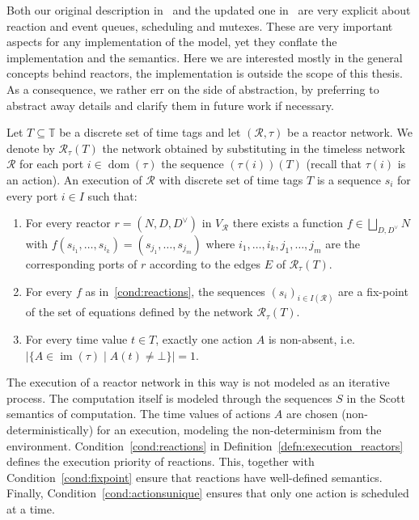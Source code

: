 Both our original description in~\cite{lohstroh_cyphy19} and the updated one in~\cite{lohstroh_phdthesis} are very explicit about reaction and event queues, scheduling and mutexes.
These are very important aspects for any implementation of the model, yet they conflate the implementation and the semantics.
Here we are interested mostly in the general concepts behind reactors, the implementation is outside the scope of this thesis.
As a consequence, we rather err on the side of abstraction, by preferring to abstract away details and clarify them in future work if necessary. 

\begin{defn}
    \label{defn:execution_reactors}
Let $T \subseteq \mathbb{T}$ be a discrete set of time tags and let $(\mathcal{R},\tau)$ be a reactor network.
We denote by $\mathcal{R}_\tau(T)$ the network obtained by substituting in the timeless network $\mathcal{R}$ for each port $i \in \operatorname{dom}(\tau)$ the sequence $(\tau(i))(T)$ (recall that $\tau(i)$ is an action).
An execution of $\mathcal{R}$ with discrete set of time tags $T$ is a sequence $s_i$ for every port $i \in I$ such that: 
\begin{enumerate}
    \item\label{cond:reactions} For every reactor $r = (N,D,D^\vee)$ in $V_\mathcal{R}$ there exists a function $f \in \bigsqcup_{D,D^\vee}N$ with $f(s_{i_1},\ldots,s_{i_k}) = (s_{j_1},\ldots,s_{j_m})$ where $i_1,\ldots,i_k,j_1,\ldots,j_m$ are the corresponding ports of $r$ according to the edges $E$ of $\mathcal{R}_\tau(T)$.
    \item\label{cond:fixpoint} For every $f$ as in~\ref{cond:reactions}, the sequences $(s_i)_{i \in I(\mathcal{R})}$ are a fix-point of the set of equations defined by the network $\mathcal{R}_\tau(T)$.
    \item\label{cond:actionsunique} For every time value $t \in T$, exactly one action $A$ is non-absent, i.e. $| \{ A  \in \operatorname{im}(\tau) \mid A(t) \neq \bot \}| = 1$.
\end{enumerate}
\end{defn}

The execution of a reactor network in this way is not modeled as an iterative process.
The computation itself is modeled through the sequences $S$ in the Scott semantics of computation.
The time values of actions $A$ are chosen (non-deterministically) for an execution, modeling the non-determinism from the environment.
Condition~\ref{cond:reactions} in Definition~\ref{defn:execution_reactors} defines the execution priority of reactions. This, together with Condition~\ref{cond:fixpoint} ensure that reactions have well-defined semantics.
Finally, Condition~\ref{cond:actionsunique} ensures that only one action is scheduled at a time.

